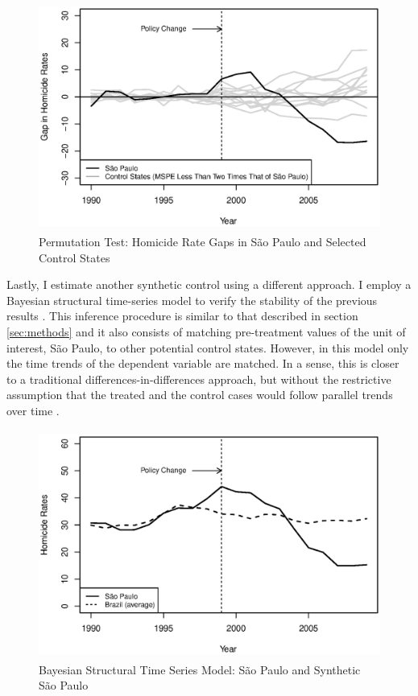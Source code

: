 \begin{figure}[H]
    \centering
    \includegraphics[height=7.5cm]{images/low-mspe.eps}
    \caption{Permutation Test: Homicide Rate Gaps in São Paulo and Selected Control States}
    \label{fig:figure7}
\end{figure}

Lastly, I estimate another synthetic control using a different approach. I employ a Bayesian structural time-series model to verify the stability of the previous results \citep{brodersen2015inferring}. This inference procedure is similar to that described in section \ref{sec:methods} and it also consists of matching pre-treatment values of the unit of interest, São Paulo, to other potential control states. However, in this model only the time trends of the dependent variable are matched. In a sense, this is closer to a traditional differences-in-differences approach, but without the restrictive assumption that the treated and the control cases would follow parallel trends over time \citep[494]{abadie2010}.  

\begin{figure}[H]
    \centering
    \includegraphics[height=7.5cm]{images/causal-impact.eps}
    \caption{Bayesian Structural Time Series Model: São Paulo and Synthetic São Paulo}
    \label{fig:figure8}
\end{figure}

